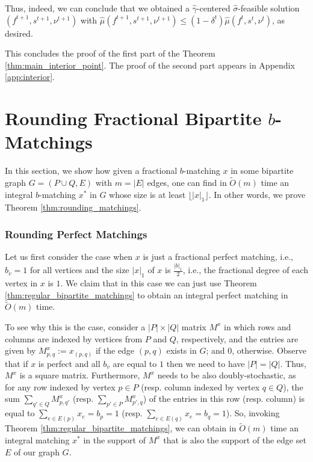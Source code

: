\documentclass[11pt, letterpaper]{article}
\newcommand{\floor}[1]{\lfloor #1 \rfloor}
\newcommand{\onorm}[1]{|#1|_{1}}
\newcommand{\tO}[1]{\widetilde{O}(#1)}
\newcommand{\hmu}{\hat{\mu}}
\newcommand{\hgamma}{\hat{\gamma}}
\newcommand{\vnu}{\boldsymbol{\mathit{\nu}}}
\newcommand{\hvsigma}{\boldsymbol{\mathit{\hat{\sigma}}}}
\newcommand{\bb}{\boldsymbol{\mathit{b}}}
\newcommand{\ff}{\boldsymbol{\mathit{f}}}
\renewcommand{\ss}{\boldsymbol{\mathit{s}}}
\newcommand{\xx}{\boldsymbol{\mathit{x}}}
\newcommand{\MM}{\boldsymbol{\mathit{M}}}
\begin{document}
Thus, indeed, we can conclude that we obtained a $\hgamma$-centered $\hvsigma$-feasible solution $(\ff^{t+1},\ss^{t+1},\vnu^{t+1})$ with $\hmu(\ff^{t+1},\ss^{t+1},\vnu^{t+1})\leq (1-\delta^t)\hmu(\ff^{t},\ss^{t},\vnu^{t})$, as desired. 

This concludes the proof of the first part of the Theorem \ref{thm:main_interior_point}. The proof of the second part appears in Appendix \ref{app:interior}. 

 \section{Rounding Fractional Bipartite $\bb$-Matchings}\label{sec:rounding}

In this section, we show how given a fractional $\bb$-matching $\xx$ in some bipartite graph $G=(P\cup Q, E)$ with $m=|E|$ edges, one can find in $\tO{m}$ time an integral $\bb$-matching $\xx^*$ in $G$ whose size is at least $\floor{\onorm{\xx}}$. In other words, we prove Theorem \ref{thm:rounding_matchings}.

\subsubsection*{Rounding Perfect Matchings}
Let us first consider the case when $\xx$ is just a fractional perfect matching, i.e., $b_v=1$ for all vertices and the size $\onorm{\xx}$ of $\xx$ is $\frac{\onorm{\bb}}{2}$, i.e., the fractional degree of each vertex in $\xx$ is $1$. We claim that in this case we can just use Theorem \ref{thm:regular_bipartite_matchings} to obtain an integral perfect matching in $\tO{m}$ time. 

To see why this is the case, consider a $|P|\times |Q|$ matrix $\MM^{\xx}$ in which rows and columns are indexed by vertices from $P$ and $Q$, respectively, and the entries are given by $M_{p,q}^{\xx}:=x_{(p,q)}$ if the edge $(p,q)$ exists in $G$; and $0$, otherwise. Observe that if $\xx$ is perfect and all $b_v$ are equal to $1$ then we need to have $|P|=|Q|$. Thus, $\MM^{\xx}$ is a square matrix. Furthermore, $\MM^{\xx}$ needs to be also doubly-stochastic, as for any row indexed by vertex $p\in P$ (resp. column indexed by vertex $q\in Q$), the sum $\sum_{q'\in Q} M^{\xx}_{p,q'}$ (resp. $\sum_{p'\in P} M^{\xx}_{p',q}$) of the entries in this row (resp. column) is equal to $\sum_{e\in E(p)} x_{e}=b_p=1$ (resp. $\sum_{e\in E(q)} x_{e}=b_q=1$). So, invoking Theorem \ref{thm:regular_bipartite_matchings}, we can obtain in $\tO{m}$ time an integral matching $\xx^*$ in the support of $\MM^{\xx}$ that is also the support of the edge set $E$ of our graph $G$. 
\end{document}
